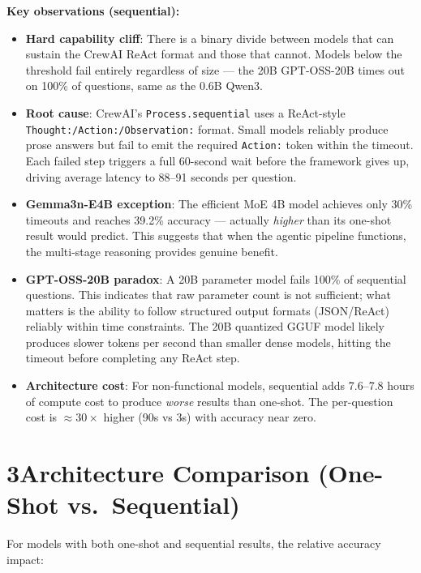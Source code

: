 \documentclass[11pt,letterpaper]{article}
\begin{document}
\noindent\textbf{Key observations (sequential):}
\begin{itemize}
  \item \textbf{Hard capability cliff}: There is a binary divide between models that can
    sustain the CrewAI ReAct format and those that cannot. Models below the threshold fail
    entirely regardless of size --- the 20B GPT-OSS-20B times out on 100\% of questions,
    same as the 0.6B Qwen3.
  \item \textbf{Root cause}: CrewAI's \texttt{Process.sequential} uses a ReAct-style
    \texttt{Thought:/Action:/Observation:} format. Small models reliably produce prose answers
    but fail to emit the required \texttt{Action:} token within the timeout. Each failed
    step triggers a full 60-second wait before the framework gives up, driving average
    latency to 88--91 seconds per question.
  \item \textbf{Gemma3n-E4B exception}: The efficient MoE 4B model achieves only 30\%
    timeouts and reaches 39.2\% accuracy --- actually \textit{higher} than its one-shot result
    would predict. This suggests that when the agentic pipeline functions, the multi-stage
    reasoning provides genuine benefit.
  \item \textbf{GPT-OSS-20B paradox}: A 20B parameter model fails 100\% of sequential
    questions. This indicates that raw parameter count is not sufficient; what matters is
    the ability to follow structured output formats (JSON/ReAct) reliably within time
    constraints. The 20B quantized GGUF model likely produces slower tokens per second
    than smaller dense models, hitting the timeout before completing any ReAct step.
  \item \textbf{Architecture cost}: For non-functional models, sequential adds 7.6--7.8 hours
    of compute cost to produce \emph{worse} results than one-shot. The per-question cost
    is $\approx 30\times$ higher (90s vs 3s) with accuracy near zero.
\end{itemize}

\newpage

\section*{3\quad Architecture Comparison (One-Shot vs.\ Sequential)}

\noindent For models with both one-shot and sequential results, the relative accuracy impact:
\end{document}
